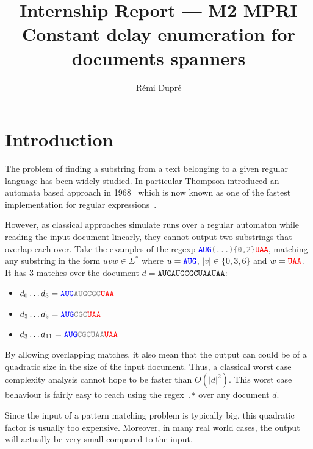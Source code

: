 \documentclass[12px]{article}
\title{%
  Internship Report --- M2 MPRI \\
  Constant delay enumeration for documents spanners
}
\author{Rémi Dupré}
\theoremstyle{definition}
\begin{document}
  \maketitle

  
  \pagebreak
  \tableofcontents
  \pagebreak

  \section{Introduction}

    The problem of finding a substring from a text belonging to a given
    regular language has been widely studied. In particular Thompson
    introduced an automata based approach in
    1968~\cite{thompson1968programming} which is now known as one of the
    fastest implementation for regular expressions~\cite{cox2007regular}.

    However, as classical approaches simulate runs over a regular automaton
    while reading the input document linearly, they cannot output two
    substrings that overlap each over. Take the examples of the regexp
    \texttt{\textcolor{blue}{AUG}\textcolor{gray}{(...)\{0,2\}}\textcolor{red}{UAA}},
    matching any substring in the form $uvw \in \Sigma^*$ where $u =
    \texttt{\textcolor{blue}{AUG}}$, $|v| \in \{0, 3, 6\}$ and $w =
    \texttt{\textcolor{red}{UAA}}$. It has 3 matches over the document $d =
    \texttt{AUGAUGCGCUAAUAA}$:
      \begin{itemize}
        \item $d_0 \ldots d_8 =
          \texttt{\textcolor{blue}{AUG}\textcolor{gray}{AUGCGC}\textcolor{red}{UAA}}$
        \item $d_3 \ldots d_8 =
          \texttt{\textcolor{blue}{AUG}\textcolor{gray}{CGC}\textcolor{red}{UAA}}$
        \item $d_3 \ldots d_{11} =
          \texttt{\textcolor{blue}{AUG}\textcolor{gray}{CGCUAA}\textcolor{red}{UAA}}$
      \end{itemize}

    By allowing overlapping matches, it also mean that the output can could be
    of a quadratic size in the size of the input document. Thus, a classical
    worst case complexity analysis cannot hope to be faster than $O(|d|^2)$.
    This worst case behaviour is fairly easy to reach using the regex
    \texttt{.*} over any document $d$.

    Since the input of a pattern matching problem is typically big, this
    quadratic factor is usually too expensive. Moreover, in many real world
    cases, the output will actually be very small compared to the input.
\end{document}
